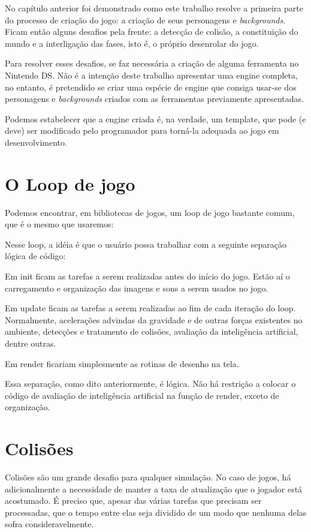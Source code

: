 \documentclass[brazil]{abnt}
\begin{document}
No capítulo anterior foi demonstrado como este trabalho resolve a primeira parte do processo de criação do jogo: a criação de seus personagens e \textit{backgrounds}. Ficam então alguns desafios pela frente: a detecção de colisão, a constituição do mundo e a interligação das fases, isto é, o próprio desenrolar do jogo.

Para resolver esses desafios, se faz necessária a criação de alguma ferramenta no Nintendo DS. Não é a intenção deste trabalho apresentar uma engine completa, no entanto, é pretendido se criar uma espécie de engine que consiga usar-se dos personagens e \textit{backgrounds} criados com as ferramentas previamente apresentadas.

Podemos estabelecer que a engine criada é, na verdade, um template, que pode (e deve) ser modificado pelo programador para torná-la adequada ao jogo em desenvolvimento.

\section{O Loop de jogo}

Podemos encontrar, em bibliotecas de jogos, um loop de jogo bastante comum, que é o mesmo que usaremos:



Nesse loop, a idéia é que o usuário possa trabalhar com a seguinte separação lógica de código:

Em init ficam as tarefas a serem realizadas antes do início do jogo. Estão aí o carregamento e organização das imagens e sons a serem usados no jogo. 

Em update ficam as tarefas a serem realizadas ao fim de cada iteração do loop. Normalmente, acelerações advindas da gravidade e de outras forças existentes no ambiente, detecções e tratamento de colisões, avaliação da inteligência artificial, dentre outras.

Em render ficariam simplesmente as rotinas de desenho na tela.

Essa separação, como dito anteriormente, é lógica. Não há restrição a colocar o código de avaliação de inteligência artificial na função de render, exceto de organização.

\section{Colisões}

Colisões são um grande desafio para qualquer simulação. No caso de jogos, há adicionalmente a necessidade de manter a taxa de atualização que o jogador está acostumado. É preciso que, apesar das várias tarefas que precisam ser processadas, que o tempo entre elas seja dividido de um modo que nenhuma delas sofra consideravelmente.
\end{document}
